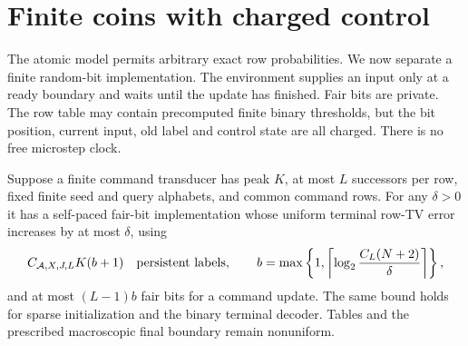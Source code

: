 \section{Finite coins with charged control}\label{sec:coins}
The atomic model permits arbitrary exact row probabilities. We now
separate a finite random-bit implementation. The environment supplies
an input only at a ready boundary and waits until the update has
finished. Fair bits are private. The row table may contain precomputed
finite binary thresholds, but the bit position, current input, old label
and control state are all charged. There is no free microstep clock.

\begin{theorem}\label{thm:compiler}
Suppose a finite command transducer has peak $K$, at most $L$ successors
per row, fixed finite seed and query alphabets, and common command rows.
For any $\delta>0$ it has a self-paced fair-bit implementation whose
uniform terminal row-TV error increases by at most $\delta$, using
\begin{equation}\label{eq:coin-cost}
 C_{\mathcal A,X,J,L}K(b+1)\quad\hbox{persistent labels},\qquad
 b=\max\left\{1,\left\lceil\log_2\frac{C_L(N+2)}{\delta}\right\rceil\right\},
\end{equation}
and at most $(L-1)b$ fair bits for a command update. The same bound
holds for sparse initialization and the binary terminal decoder.
Tables and the prescribed macroscopic final boundary remain nonuniform.
\end{theorem}

